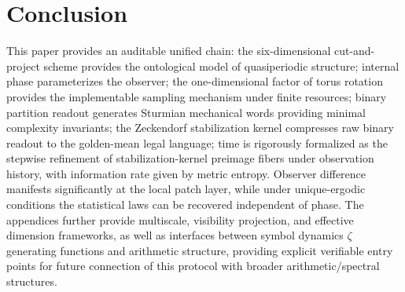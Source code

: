 \section{Conclusion}

This paper provides an auditable unified chain: the six-dimensional cut-and-project scheme provides the ontological model of quasiperiodic structure; internal phase parameterizes the observer; the one-dimensional factor of torus rotation provides the implementable sampling mechanism under finite resources; binary partition readout generates Sturmian mechanical words providing minimal complexity invariants; the Zeckendorf stabilization kernel compresses raw binary readout to the golden-mean legal language; time is rigorously formalized as the stepwise refinement of stabilization-kernel preimage fibers under observation history, with information rate given by metric entropy. Observer difference manifests significantly at the local patch layer, while under unique-ergodic conditions the statistical laws can be recovered independent of phase. The appendices further provide multiscale, visibility projection, and effective dimension frameworks, as well as interfaces between symbol dynamics $\zeta$ generating functions and arithmetic structure, providing explicit verifiable entry points for future connection of this protocol with broader arithmetic/spectral structures.
